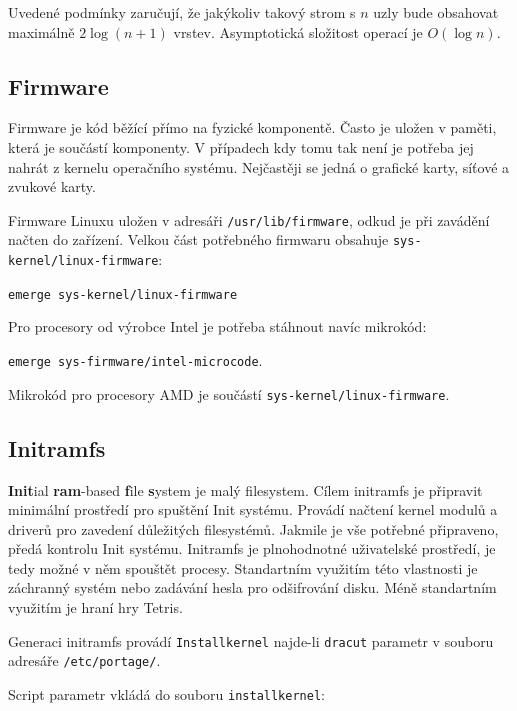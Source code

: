 \documentclass[12pt,a4paper,twoside,]{article}
\begin{document}
{{{{{{{\hspace*{-1.5em}Uvedené podmínky zaručují, že jakýkoliv takový strom s $n$ uzly bude obsahovat \\maximálně $2\log(n+1)$ vrstev. Asymptotická složitost operací je $O(\log n)$.\\



\subsection{\textsf{Firmware}}
Firmware je kód běžící přímo na fyzické komponentě. Často je uložen v paměti, která je součástí komponenty. V případech kdy tomu tak není je potřeba jej nahrát z kernelu operačního systému. Nejčastěji se jedná o grafické karty, síťové a zvukové karty. 

Firmware Linuxu uložen v adresáři \texttt{/usr/lib/firmware}, odkud je při zavádění načten do zařízení. Velkou část potřebného firmwaru obsahuje \texttt{sys-kernel/linux-firmware}:

\texttt{emerge sys-kernel/linux-firmware}

\hspace{-1.5em}Pro procesory od výrobce Intel je potřeba stáhnout navíc mikrokód:

\texttt{emerge sys-firmware/intel-microcode}. 

\hspace{-1.5em}Mikrokód pro procesory AMD je součástí  \texttt{sys-kernel/linux-firmware}.
\subsection{\textsf{Initramfs}} \hypertarget{Initramfs}{}
{\bf Init}ial {\bf ram}-based {\bf f}ile {\bf s}ystem je malý filesystem. Cílem initramfs je připravit minimální prostředí pro spuštění Init systému. Provádí načtení kernel modulů a driverů pro zavedení důležitých filesystémů. Jakmile je vše potřebné připraveno, předá kontrolu Init systému.
Initramfs je plnohodnotné uživatelské prostředí, je tedy možné v něm spouštět procesy. Standartním využitím této vlastnosti je záchranný systém nebo zadávání hesla pro odšifrování disku. Méně standartním využitím je hraní hry Tetris. 

Generaci initramfs provádí \texttt{Installkernel} najde-li \texttt{dracut} parametr v souboru adresáře \texttt{/etc/portage/}.

\hspace{-1.5em}Script parametr vkládá do souboru \texttt{installkernel}:

}}}}}}}
\end{document}
